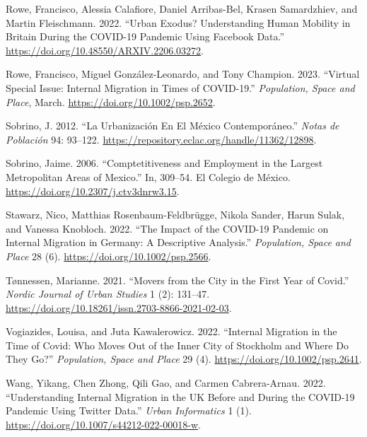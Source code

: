 \documentclass[
  10pt,
  letterpaper,
  DIV=11,
  numbers=noendperiod]{scrartcl}
\newlength{\cslhangindent}
\newlength{\cslentryspacingunit} %
\newenvironment{CSLReferences}[2] %
 {%
  \setlength{\parindent}{0pt}
  \ifodd #1
  \let\oldpar\par
  \def\par{\hangindent=\cslhangindent\oldpar}
  \fi
  \setlength{\parskip}{#2\cslentryspacingunit}
 }%
 {}
\begin{document}
\begin{CSLReferences}{1}{0}
\leavevmode{}%
Rowe, Francisco, Alessia Calafiore, Daniel Arribas-Bel, Krasen
Samardzhiev, and Martin Fleischmann. 2022. {``Urban Exodus?
Understanding Human Mobility in Britain During the COVID-19 Pandemic
Using Facebook Data.''} \url{https://doi.org/10.48550/ARXIV.2206.03272}.

\leavevmode{}%
Rowe, Francisco, Miguel González-Leonardo, and Tony Champion. 2023.
{``Virtual Special Issue: Internal Migration in Times of COVID{-}19.''}
\emph{Population, Space and Place}, March.
\url{https://doi.org/10.1002/psp.2652}.

\leavevmode{}%
Sobrino, J. 2012. {``La Urbanización En El México Contemporáneo.''}
\emph{Notas de Población} 94: 93--122.
\url{https://repository.eclac.org/handle/11362/12898}.

\leavevmode{}%
Sobrino, Jaime. 2006. {``Comptetitiveness and Employment in the Largest
Metropolitan Areas of Mexico.''} In, 309--54. El Colegio de México.
\url{https://doi.org/10.2307/j.ctv3dnrw3.15}.

\leavevmode{}%
Stawarz, Nico, Matthias Rosenbaum-Feldbrügge, Nikola Sander, Harun
Sulak, and Vanessa Knobloch. 2022. {``The Impact of the COVID{-}19
Pandemic on Internal Migration in Germany: A Descriptive Analysis.''}
\emph{Population, Space and Place} 28 (6).
\url{https://doi.org/10.1002/psp.2566}.

\leavevmode{}%
Tønnessen, Marianne. 2021. {``Movers from the City in the First Year of
Covid.''} \emph{Nordic Journal of Urban Studies} 1 (2): 131--47.
\url{https://doi.org/10.18261/issn.2703-8866-2021-02-03}.

\leavevmode{}%
Vogiazides, Louisa, and Juta Kawalerowicz. 2022. {``Internal Migration
in the Time of Covid: Who Moves Out of the Inner City of Stockholm and
Where Do They Go?''} \emph{Population, Space and Place} 29 (4).
\url{https://doi.org/10.1002/psp.2641}.

\leavevmode{}%
Wang, Yikang, Chen Zhong, Qili Gao, and Carmen Cabrera-Arnau. 2022.
{``Understanding Internal Migration in the UK Before and During the
COVID-19 Pandemic Using Twitter Data.''} \emph{Urban Informatics} 1 (1).
\url{https://doi.org/10.1007/s44212-022-00018-w}.

\end{CSLReferences}
\end{document}
